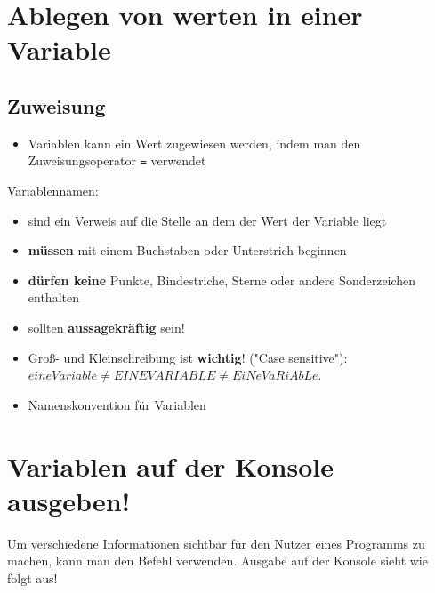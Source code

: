 \section{Ablegen von werten in einer Variable}
\subsection{Zuweisung}
\begin{frame}
    \slidehead
    \begin{itemize}[<+->]
        \item Variablen kann ein Wert zugewiesen werden, indem man den Zuweisungsoperator \lstinline{=} verwendet\\

    \end{itemize}
    \onslide<+->
\end{frame}

\begin{frame}
    \slidehead

    Variablennamen:
    \begin{itemize}[<+->]
        \item sind ein Verweis auf die Stelle an dem der Wert der Variable liegt
        \item \textbf{müssen} mit einem Buchstaben oder Unterstrich beginnen
        \item \textbf{dürfen keine} Punkte, Bindestriche, Sterne oder andere Sonderzeichen enthalten
        \item sollten \textbf{aussagekräftig} sein!
        \item Groß- und Kleinschreibung ist \textbf{wichtig}! ("Case sensitive"):\\ $eineVariable \neq EINEVARIABLE \neq EiNeVaRiAbLe$.
        \item Namenskonvention  für Variablen
    \end{itemize}
\end{frame}

\section{Variablen auf der Konsole ausgeben!}
\begin{frame}
    \slidehead
    Um verschiedene Informationen sichtbar für den Nutzer eines Programms zu machen, kann man den Befehl  verwenden.
    Ausgabe auf der Konsole sieht wie folgt aus!
\end{frame}

